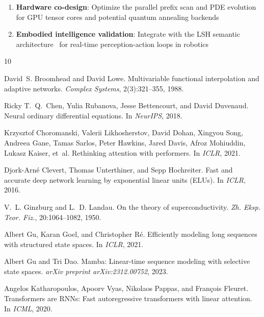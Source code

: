 \documentclass{article}
\begin{document}
\begin{enumerate}
\item \textbf{Hardware co-design}: Optimize the parallel prefix scan and PDE evolution for GPU tensor cores and potential quantum annealing backends
\item \textbf{Embodied intelligence validation}: Integrate with the LSH semantic architecture~\cite{lsh-three-layer} for real-time perception-action loops in robotics
\end{enumerate}


\begin{thebibliography}{10}

David~S. Broomhead and David Lowe.
\newblock Multivariable functional interpolation and adaptive networks.
\newblock \emph{Complex Systems}, 2(3):321--355, 1988.

Ricky T.~Q.~Chen, Yulia Rubanova, Jesse Bettencourt, and David Duvenaud.
\newblock Neural ordinary differential equations.
\newblock In \emph{NeurIPS}, 2018.

Krzysztof Choromanski, Valerii Likhosherstov, David Dohan, Xingyou Song, Andreea Gane, Tamas Sarlos, Peter Hawkins, Jared Davis, Afroz Mohiuddin, Lukasz Kaiser, et~al.
\newblock Rethinking attention with performers.
\newblock In \emph{ICLR}, 2021.

Djork-Arn\'{e} Clevert, Thomas Unterthiner, and Sepp Hochreiter.
\newblock Fast and accurate deep network learning by exponential linear units (ELUs).
\newblock In \emph{ICLR}, 2016.

V.~L. Ginzburg and L.~D. Landau.
\newblock On the theory of superconductivity.
\newblock \emph{Zh. Eksp. Teor. Fiz.}, 20:1064--1082, 1950.

Albert Gu, Karan Goel, and Christopher R{\'e}.
\newblock Efficiently modeling long sequences with structured state spaces.
\newblock In \emph{ICLR}, 2021.

Albert Gu and Tri Dao.
\newblock Mamba: Linear-time sequence modeling with selective state spaces.
\newblock \emph{arXiv preprint arXiv:2312.00752}, 2023.

Angelos Katharopoulos, Apoorv Vyas, Nikolaos Pappas, and Fran{\c{c}}ois Fleuret.
\newblock Transformers are RNNs: Fast autoregressive transformers with linear attention.
\newblock In \emph{ICML}, 2020.


\end{thebibliography}
\end{document}
